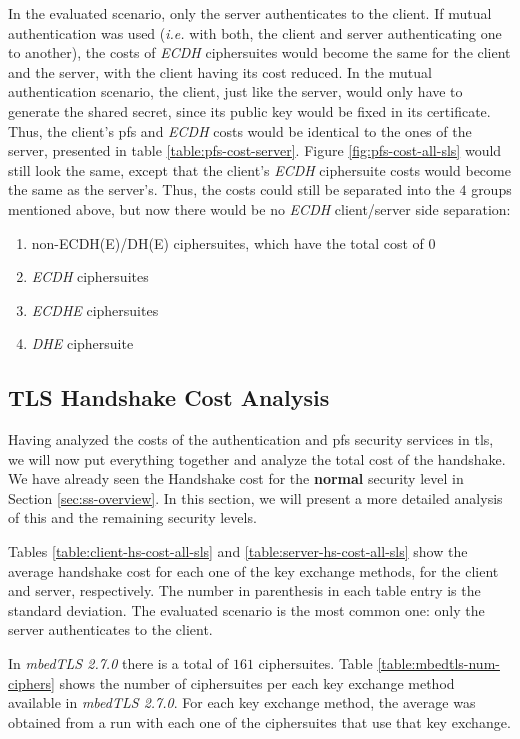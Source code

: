 \documentclass{llncs}
\begin{document}
In the evaluated scenario, only the server authenticates to the client. If mutual authentication was used (\textit{i.e.} with both, the client
and server authenticating one to another), the costs of \textit{ECDH} ciphersuites would become the same for the client and the server, with the client
having its cost reduced. In the mutual authentication scenario, the client, just like the server, would only have to generate the shared secret, since
its public key would be fixed in its certificate. Thus, the client's \gls{pfs} and \textit{ECDH} costs would be identical to the ones of the server,
presented in table \ref{table:pfs-cost-server}. Figure \ref{fig:pfs-cost-all-sls} would still look the same, except that the client's \textit{ECDH}
ciphersuite costs would become the same as the server's. Thus, the costs could still be separated into the $4$ groups mentioned above,
but now there would be no \textit{ECDH} client/server side separation:

\begin{enumerate}
  \item non-ECDH(E)/DH(E) ciphersuites, which have the total cost of $0$
  \item \textit{ECDH} ciphersuites
  \item \textit{ECDHE} ciphersuites
  \item \textit{DHE} ciphersuite
\end{enumerate}

\subsection{TLS Handshake Cost Analysis} \label{sec:tls-hs-cost}

Having analyzed the costs of the authentication and \gls{pfs} security services in \gls{tls}, we will now put everything together and
analyze the total cost of the handshake. We have already seen the Handshake cost for the \textbf{normal} security level in
Section \ref{sec:ss-overview}. In this section, we will present a more detailed analysis of this and the remaining security levels.

Tables \ref{table:client-hs-cost-all-sls} and \ref{table:server-hs-cost-all-sls} show the average handshake cost for each one of the
key exchange methods, for the client and server, respectively. The number in parenthesis in each table entry is the standard deviation.
The evaluated scenario is the most common one: only the server authenticates to the client.

In \textit{mbedTLS 2.7.0} there is a total of $161$ ciphersuites. Table \ref{table:mbedtls-num-ciphers} shows the number of
ciphersuites per each key exchange method available in \textit{mbedTLS 2.7.0}. For each key exchange method, the average was obtained
from a run with each one of the ciphersuites that use that key exchange.
\end{document}
